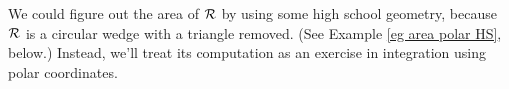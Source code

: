 \begin{eg}
We could figure out the area of $\mathcal{R}$ by using some high school geometry,
because $\mathcal{R}$ is a circular wedge with a triangle removed. 
(See Example \ref{eg area polar HS}, below.)
Instead, we'll treat its computation as an exercise in integration 
using polar coordinates. 



\end{eg}
